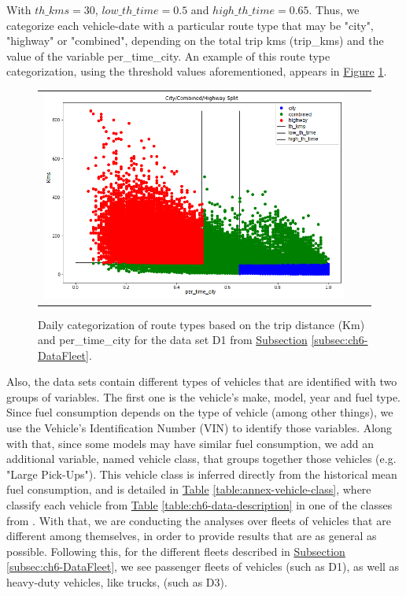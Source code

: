 With $th\_kms = 30$, $low\_th\_time = 0.5$ and $high\_th\_time = 0.65$.
Thus, we categorize each vehicle-date with a particular route type that may be "city", "highway" or "combined", depending on the total trip kms (trip\_kms) and the value of the variable per\_time\_city. An example of this route type categorization, using the threshold values aforementioned, appears in \hyperref[figure:annex-split-city-comb-hwy]{Figure} \ref{figure:annex-split-city-comb-hwy}.

\begin{figure}[h!]
\centering
 \begin{tabular}{c@{\qquad}c@{\qquad}c}
\includegraphics[width=0.6 \columnwidth]{figures/chapter6_LucaFleet/split_city_comb_hwy.png}
  \end{tabular} 
  \caption{Daily categorization of route types based on the trip distance (Km) and per\_time\_city for the data set D1 from \hyperref[subsec:ch6-DataFleet]{Subsection} \ref{subsec:ch6-DataFleet}.  \label{figure:annex-split-city-comb-hwy}}
\end{figure}

Also, the data sets contain different types of vehicles that are identified with two groups of variables. The first one is the vehicle's make, model, year and fuel type. Since fuel consumption depends on the type of vehicle (among other things), we use the Vehicle's Identification Number (VIN) to identify those variables.
Along with that, since some models may have similar fuel consumption, we add an additional variable, named vehicle class, that groups together those vehicles (e.g. "Large Pick-Ups"). This vehicle class is inferred directly from the historical mean fuel consumption, and is detailed in \hyperref[table:annex-vehicle-class]{Table} \ref{table:annex-vehicle-class}, where classify each vehicle from \hyperref[table:ch6-data-description]{Table} \ref{table:ch6-data-description} in one of the classes from \parencite[p.~18]{national2010technologies}.
With that, we are conducting the analyses over fleets of vehicles that are different among themselves, in order to provide results that are as general as possible. Following this, for the different fleets described in \hyperref[subsec:ch6-DataFleet]{Subsection} \ref{subsec:ch6-DataFleet}, we see passenger fleets of vehicles (such as D1), as well as heavy-duty vehicles, like trucks, (such as D3). 

